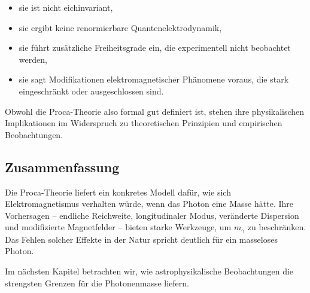 \begin{itemize}
	\item sie ist nicht eichinvariant,
	\item sie ergibt keine renormierbare Quantenelektrodynamik,
	\item sie führt zusätzliche Freiheitsgrade ein, die experimentell 
	nicht beobachtet werden,
	\item sie sagt Modifikationen elektromagnetischer Phänomene voraus, 
	die stark eingeschränkt oder ausgeschlossen sind.
\end{itemize}

Obwohl die Proca-Theorie also formal gut definiert ist, stehen ihre 
physikalischen Implikationen im Widerspruch zu theoretischen Prinzipien 
und empirischen Beobachtungen.

\subsection*{Zusammenfassung}

Die Proca-Theorie liefert ein konkretes Modell dafür, wie sich 
Elektromagnetismus verhalten würde, wenn das Photon eine Masse hätte.  
Ihre Vorhersagen – endliche Reichweite, longitudinaler Modus, veränderte 
Dispersion und modifizierte Magnetfelder – bieten starke Werkzeuge, um 
$m_\gamma$ zu beschränken. Das Fehlen solcher Effekte in der Natur spricht 
deutlich für ein masseloses Photon.

Im nächsten Kapitel betrachten wir, wie astrophysikalische Beobachtungen 
die strengsten Grenzen für die Photonenmasse liefern.
